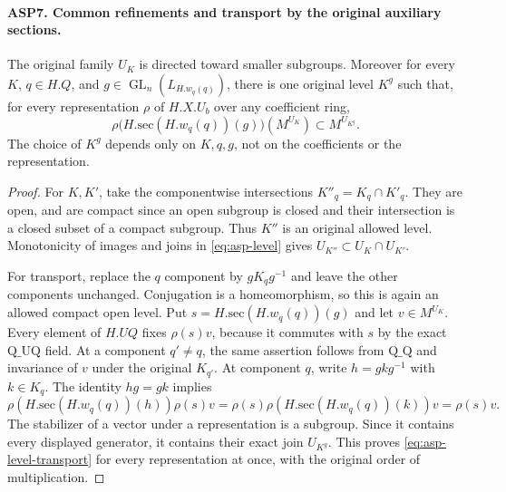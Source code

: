\documentclass[11pt,a4paper]{article}
\numberwithin{equation}{section}
\theoremstyle{remark}\newtheorem{remark}[theorem]{Remark}
\begin{document}
\paragraph{ASP7. Common refinements and transport by the original auxiliary sections.}
\label{claim:ASP7}
The original family $U_K$ is directed toward smaller
subgroups.  Moreover for every $K$, $q\in H.Q$, and
$g\in\operatorname{GL}_n(L_{H.w_q(q)})$, there is
one original level $K^g$ such that, for every
representation $\rho$ of $H.X.U_b$ over any
coefficient ring,
\begin{equation}\label{eq:asp-level-transport}
 \rho\bigl(H.\mathrm{sec}(H.w_q(q))(g)\bigr)
                     (M^{U_K})\subset M^{U_{K^g}}.
\end{equation}
The choice of $K^g$ depends only on $K,\allowbreak{} q,\allowbreak{} g$, not
on the coefficients or the representation.
\begin{proof}
For $K,\allowbreak{} K'$, take the componentwise intersections
$K''_q=K_q\cap K'_q$.  They are open, and are
compact since an open subgroup is closed and
their intersection is a closed subset of a compact
subgroup.  Thus $K''$ is an original allowed
level.  Monotonicity of images and joins in
\eqref{eq:asp-level} gives
$U_{K''}\subset U_K\cap U_{K'}$.

For transport, replace the $q$ component by
$gK_qg^{-1}$ and leave the other components
unchanged.  Conjugation is a homeomorphism,
so this is again an allowed compact open level.
Put $s=H.\mathrm{sec}(H.w_q(q))(g)$ and let
$v\in M^{U_K}$.  Every element of $H.UQ$
fixes $\rho(s)v$, because it commutes with $s$
by the exact $\mathrm{Q\_\allowbreak UQ}$ field.  At a
component $q'\ne q$, the same assertion follows
from $\mathrm{Q\_\allowbreak Q}$ and invariance of $v$
under the original $K_{q'}$.  At component $q$,
write $h=gkg^{-1}$ with $k\in K_q$.  The
identity $hg=gk$ implies
\[
 \rho(H.\mathrm{sec}(H.w_q(q))(h))\rho(s)v
   =\rho(s)\rho(H.\mathrm{sec}(H.w_q(q))(k))v
   =\rho(s)v.
\]
The stabilizer of a vector under a representation
is a subgroup.  Since it contains every displayed
generator, it contains their exact join $U_{K^g}$.
This proves \eqref{eq:asp-level-transport} for every
representation at once, with the original order
of multiplication.
\end{proof}

\end{document}
